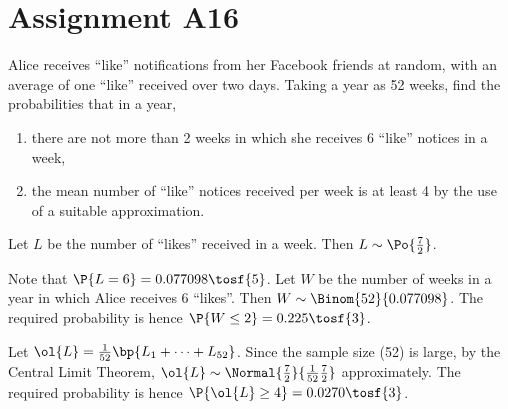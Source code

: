 \section{Assignment A16}

\begin{problem}
    Alice receives ``like'' notifications from her Facebook friends at random, with an average of one ``like'' received over two days. Taking a year as 52 weeks, find the probabilities that in a year,
    \begin{enumerate}
        \item there are not more than 2 weeks in which she receives 6 ``like'' notices in a week,
        \item the mean number of ``like'' notices received per week is at least 4 by the use of a suitable approximation.
    \end{enumerate}
\end{problem}
\begin{solution}
    Let $L$ be the number of ``likes'' received in a week. Then $L \sim \Po{\frac72}$.

    \begin{ppart}
        Note that $\P{L = 6} = 0.077098 \tosf{5}$. Let $W$ be the number of weeks in a year in which Alice receives 6 ``likes''. Then $W \sim \Binom{52}{0.077098}$. The required probability is hence $\P{W \leq 2} = 0.225 \tosf{3}$.
    \end{ppart}
    \begin{ppart}
        Let $\ol{L} = \frac1{52} \bp{L_1 + \dots + L_{52}}$. Since the sample size (52) is large, by the Central Limit Theorem, $\ol{L} \sim \Normal{\frac72}{\frac1{52} \frac72}$ approximately. The required probability is hence $\P{\ol{L} \geq 4} = 0.0270 \tosf{3}$.
    \end{ppart}
\end{solution}

